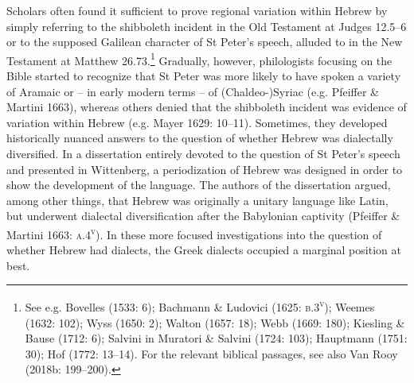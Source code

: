 \documentclass[12pt]{article}
\newenvironment{styleStandard}{\renewcommand\baselinestretch{1.25}\setlength\leftskip{0in}\setlength\rightskip{0in}\setlength\parindent{0.1972in}\setlength\parfillskip{0pt plus 1fil}\setlength\parskip{0in plus 1pt}\writerlistparindent\writerlistleftskip\leavevmode\normalfont\normalsize\writerlistlabel\ignorespaces}{\unskip\vspace{0in plus 1pt}\par}
\newcommand\writerlistleftskip{}
\newcommand\writerlistparindent{}
\newcommand\writerlistlabel{}
\begin{document}
\begin{styleStandard}
Scholars often found it sufficient to prove regional variation within Hebrew by simply referring to the shibboleth incident in the Old Testament at Judges 12.5–6 or to the supposed Galilean character of St Peter’s speech, alluded to in the New Testament at Matthew 26.73.\footnote{ See e.g. Bovelles (1533: 6); Bachmann \& Ludovici (1625: \textsc{b.3}\textsc{\textsuperscript{v}}); Weemes (1632: 102); Wyss (1650: 2); Walton (1657: 18); Webb (1669: 180); Kiesling \& Bause (1712: 6); Salvini in Muratori \& Salvini (1724: 103); Hauptmann (1751: 30); Hof (1772: 13–14). For the relevant biblical passages, see also Van Rooy (2018b: 199–200).} Gradually, however, philologists focusing on the Bible started to recognize that St Peter was more likely to have spoken a variety of Aramaic or – in early modern terms – of (Chaldeo-)Syriac (e.g. Pfeiffer \& Martini 1663), whereas others denied that the shibboleth incident was evidence of variation within Hebrew (e.g. Mayer 1629: 10–11). Sometimes, they developed historically nuanced answers to the question of whether Hebrew was dialectally diversified. In a dissertation entirely devoted to the question of St Peter’s speech and presented in Wittenberg, a periodization of Hebrew was designed in order to show the development of the language. The authors of the dissertation argued, among other things, that Hebrew was originally a unitary language like Latin, but underwent dialectal diversification after the Babylonian captivity (Pfeiffer \& Martini 1663: \textsc{a.4}\textsc{\textsuperscript{v}}). In these more focused investigations into the question of whether Hebrew had dialects, the Greek dialects occupied a marginal position at best.
\end{styleStandard}
\end{document}
